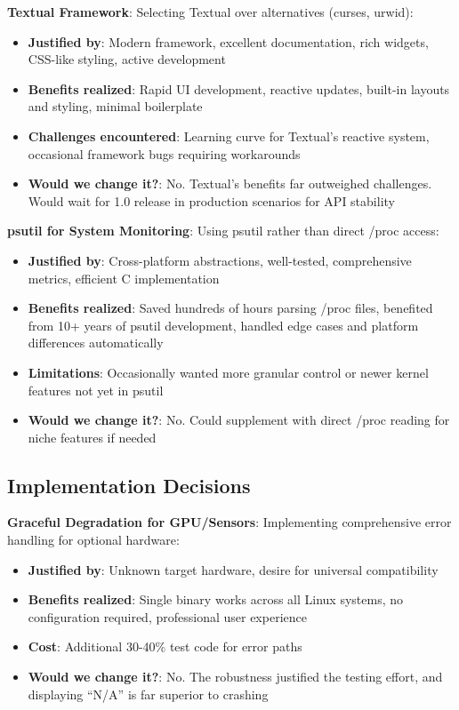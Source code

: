 \documentclass[12pt,a4paper,oneside]{report}
\begin{document}
\textbf{Textual Framework}: Selecting Textual over alternatives (curses, urwid):

\begin{itemize}
    \item \textbf{Justified by}: Modern framework, excellent documentation, rich widgets, CSS-like styling, active development
    \item \textbf{Benefits realized}: Rapid UI development, reactive updates, built-in layouts and styling, minimal boilerplate
    \item \textbf{Challenges encountered}: Learning curve for Textual's reactive system, occasional framework bugs requiring workarounds
    \item \textbf{Would we change it?}: No. Textual's benefits far outweighed challenges. Would wait for 1.0 release in production scenarios for API stability
\end{itemize}

\textbf{psutil for System Monitoring}: Using psutil rather than direct /proc access:

\begin{itemize}
    \item \textbf{Justified by}: Cross-platform abstractions, well-tested, comprehensive metrics, efficient C implementation
    \item \textbf{Benefits realized}: Saved hundreds of hours parsing /proc files, benefited from 10+ years of psutil development, handled edge cases and platform differences automatically
    \item \textbf{Limitations}: Occasionally wanted more granular control or newer kernel features not yet in psutil
    \item \textbf{Would we change it?}: No. Could supplement with direct /proc reading for niche features if needed
\end{itemize}

\subsection{Implementation Decisions}

\textbf{Graceful Degradation for GPU/Sensors}: Implementing comprehensive error handling for optional hardware:

\begin{itemize}
    \item \textbf{Justified by}: Unknown target hardware, desire for universal compatibility
    \item \textbf{Benefits realized}: Single binary works across all Linux systems, no configuration required, professional user experience
    \item \textbf{Cost}: Additional 30-40\% test code for error paths
    \item \textbf{Would we change it?}: No. The robustness justified the testing effort, and displaying ``N/A'' is far superior to crashing
\end{itemize}
\end{document}

